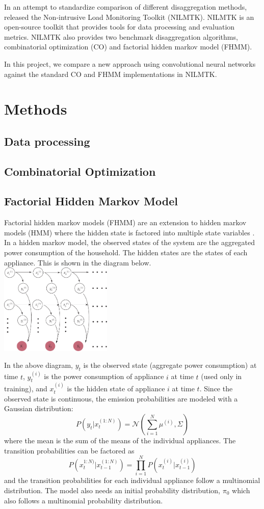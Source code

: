 \documentclass[11pt]{article}
\begin{document}
In an attempt to standardize comparison of different disaggregation methods, \citet{Batra} released the Non-intrusive Load Monitoring Toolkit (NILMTK). NILMTK is an open-source toolkit that provides tools for data processing and evaluation metrics. NILMTK also provides two benchmark disaggregation algorithms, combinatorial optimization (CO) and factorial hidden markov model (FHMM). 

In this project, we compare a new approach using convolutional neural networks against the standard CO and FHMM implementations in NILMTK. 

\section{Methods}
\subsection{Data processing}
\subsection{Combinatorial Optimization}
\subsection{Factorial Hidden Markov Model}
Factorial hidden markov models (FHMM) are an extension to hidden markov models (HMM) where the hidden state is factored into multiple state variables \citep{Ghahraani}. In a hidden markov model, the observed states of the system are the aggregated power consumption of the household. The hidden states are the states of each appliance. This is shown in the diagram below. \\ 
\includegraphics[width=0.4\textwidth]{../figures/FHMM.pdf}

In the above diagram, $y_t$ is the observed state (aggregate power consumption) at time $t$, $y_t^{(i)}$ is the power consumption of appliance $i$ at time $t$ (used only in training), and $x_t^{(i)}$ is the hidden state of appliance $i$ at time $t$. Since the observed state is continuous, the emission probabilities are modeled with a Gaussian distribution: 
\[P(y_t|x_t^{(1:N)}) = \mathcal{N} \left(\sum_{i=1}^N \mu^{(i)}, \Sigma \right) \]
where the mean is the sum of the means of the individual appliances. The transition probabilities can be factored as
\[P(x_t^{1:N)}|x_{t-1}^{(1:N)}) = \prod_{i=1}^{N} P(x_t^{(i)}|x_{t-1}^{(i)})\]
and the transition probabilities for each individual appliance follow a multinomial distribution. The model also needs an initial probability distribution, $\pi_0$ which also follows a multinomial probability distribution.  
\end{document}
